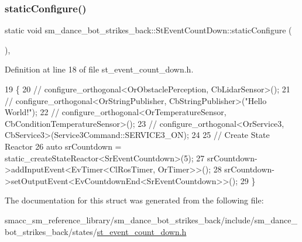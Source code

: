 \subsubsection{\texorpdfstring{static\+Configure()}{staticConfigure()}}
{\footnotesize\ttfamily static void sm\+\_\+dance\+\_\+bot\+\_\+strikes\+\_\+back\+::\+St\+Event\+Count\+Down\+::static\+Configure (\begin{DoxyParamCaption}{ }\end{DoxyParamCaption})\hspace{0.3cm}{\ttfamily [inline]}, {\ttfamily [static]}}



Definition at line 18 of file st\+\_\+event\+\_\+count\+\_\+down.\+h.


\begin{DoxyCode}
19     \{
20         \textcolor{comment}{//   configure\_orthogonal<OrObstaclePerception, CbLidarSensor>();}
21         \textcolor{comment}{//   configure\_orthogonal<OrStringPublisher, CbStringPublisher>("Hello World!");}
22         \textcolor{comment}{//   configure\_orthogonal<OrTemperatureSensor, CbConditionTemperatureSensor>();}
23         \textcolor{comment}{//   configure\_orthogonal<OrService3, CbService3>(Service3Command::SERVICE3\_ON);        }
24         
25         \textcolor{comment}{// Create State Reactor}
26         \textcolor{keyword}{auto} srCountdown = static\_createStateReactor<SrEventCountdown>(5);        
27         srCountdown->addInputEvent<EvTimer<ClRosTimer, OrTimer>>();
28         srCountdown->setOutputEvent<EvCountdownEnd<SrEventCountdown>>();
29     \}
\end{DoxyCode}


The documentation for this struct was generated from the following file\+:\begin{DoxyCompactItemize}
\item 
smacc\+\_\+sm\+\_\+reference\+\_\+library/sm\+\_\+dance\+\_\+bot\+\_\+strikes\+\_\+back/include/sm\+\_\+dance\+\_\+bot\+\_\+strikes\+\_\+back/states/\hyperlink{sm__dance__bot__strikes__back_2include_2sm__dance__bot__strikes__back_2states_2st__event__count__down_8h}{st\+\_\+event\+\_\+count\+\_\+down.\+h}\end{DoxyCompactItemize}
